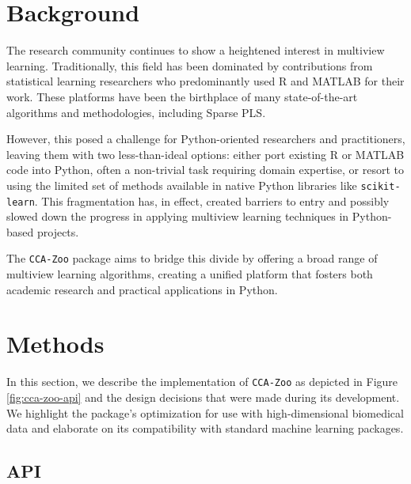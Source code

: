 \section{Background}

The research community continues to show a heightened interest in multiview learning.
Traditionally, this field has been dominated by contributions from statistical learning researchers who predominantly used R and MATLAB for their work.
These platforms have been the birthplace of many state-of-the-art algorithms and methodologies, including Sparse PLS.

However, this posed a challenge for Python-oriented researchers and practitioners, leaving them with two less-than-ideal options: either port existing R or MATLAB code into Python, often a non-trivial task requiring domain expertise, or resort to using the limited set of methods available in native Python libraries like \texttt{scikit-learn}.
This fragmentation has, in effect, created barriers to entry and possibly slowed down the progress in applying multiview learning techniques in Python-based projects.

The \texttt{CCA-Zoo} package aims to bridge this divide by offering a broad range of multiview learning algorithms, creating a unified platform that fosters both academic research and practical applications in Python.

\section{Methods}

In this section, we describe the implementation of \texttt{CCA-Zoo} as depicted in Figure \ref{fig:cca-zoo-api} and the design decisions that were made during its development.
We highlight the package's optimization for use with high-dimensional biomedical data and elaborate on its compatibility with standard machine learning packages.

\subsection{API}

